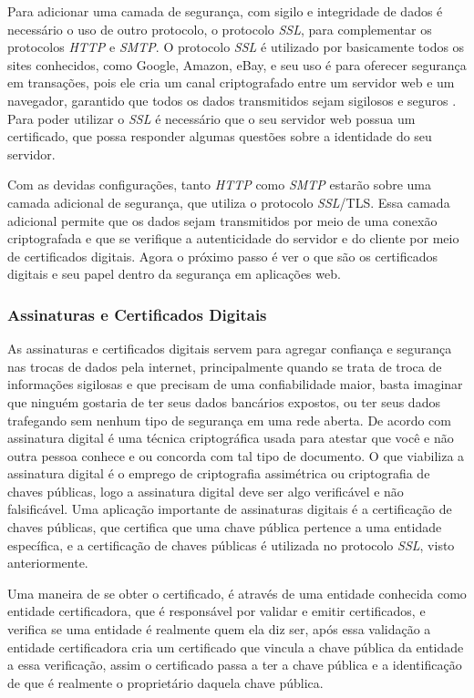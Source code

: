 Para adicionar uma camada de segurança, com sigilo e integridade de dados é necessário
o uso de outro protocolo, o protocolo \textit{SSL}, para complementar os protocolos \textit{HTTP}
e \textit{SMTP}. O protocolo \textit{SSL} é utilizado por basicamente todos os sites conhecidos, como Google,
Amazon, eBay, e seu uso é para oferecer segurança em transações, pois ele cria um
canal criptografado entre um servidor web e um navegador, garantido que todos os
dados transmitidos sejam sigilosos e seguros \cite{kurose2010redes}. Para poder
utilizar o \textit{SSL} é necessário que o seu servidor web possua um certificado, que
possa responder algumas questões sobre a identidade do seu servidor.

Com as devidas configurações, tanto \textit{HTTP} como \textit{SMTP} estarão sobre uma camada adicional de segurança,
que utiliza o protocolo \textit{SSL}/TLS. Essa camada adicional permite que os dados sejam
transmitidos por meio de uma conexão criptografada e que se verifique a autenticidade
do servidor e do cliente por meio de certificados digitais. Agora o próximo passo
é ver o que são os certificados digitais e seu papel dentro da segurança em aplicações web.

\subsubsection{Assinaturas e Certificados Digitais}

As assinaturas e certificados digitais servem para agregar confiança e segurança
nas trocas de dados pela internet, principalmente quando se trata de troca de informações
sigilosas e que precisam de uma confiabilidade maior, basta imaginar que ninguém
gostaria de ter seus dados bancários expostos, ou ter seus dados trafegando sem
nenhum tipo de segurança em uma rede aberta. De acordo com \cite{kurose2010redes}
assinatura digital é uma técnica criptográfica usada para atestar que você e não
outra pessoa conhece e ou concorda com tal tipo de documento. O que viabiliza a
assinatura digital é o emprego de criptografia assimétrica ou criptografia de chaves
públicas, logo a assinatura digital deve ser algo verificável e não falsificável. Uma
aplicação importante de assinaturas digitais é a certificação de chaves públicas,
que certifica que uma chave pública pertence a uma entidade específica\cite{kurose2010redes},
e a certificação de chaves públicas é utilizada no protocolo \textit{SSL}, visto anteriormente.

Uma maneira de se obter o certificado, é através de uma entidade conhecida como
entidade certificadora, que é responsável por validar e emitir certificados, e
verifica se uma entidade é realmente quem ela diz ser, após essa validação a
entidade certificadora cria um certificado que vincula a chave pública da entidade
a essa verificação, assim o certificado passa a ter a chave pública e a
identificação de que é realmente o proprietário daquela chave pública.

